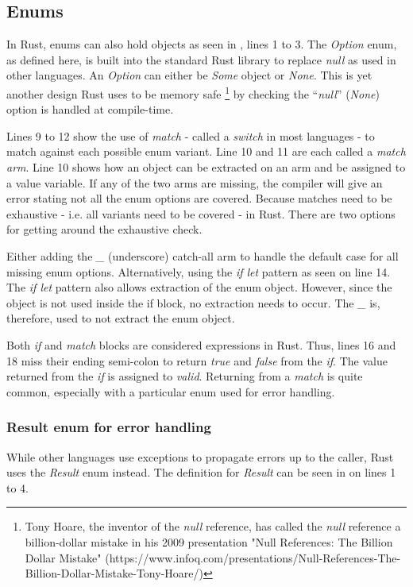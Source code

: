 \subsection{Enums}
In Rust, enums can also hold objects \cite{klabnik_2019_01} as seen in , lines 1 to 3.
The \textit{Option} enum, as defined here, is built into the standard Rust library \cite{klabnik_2019_01} to replace \textit{null} as used in other languages.
An \textit{Option} can either be \textit{Some} object or \textit{None}.
This is yet another design Rust uses to be memory safe \footnote{Tony Hoare, the inventor of the \textit{null} reference, has called the \textit{null} reference a billion-dollar mistake in his 2009 presentation "Null References: The Billion Dollar Mistake" (https://www.infoq.com/presentations/Null-References-The-Billion-Dollar-Mistake-Tony-Hoare/)} by checking the ``\textit{null}'' (\textit{None}) option is handled at compile-time.


Lines 9 to 12 show the use of \textit{match} - called a \textit{switch} in most languages - to match against each possible enum variant.
Line 10 and 11 are each called a \textit{match arm}.
Line 10 shows how an object can be extracted on an arm and be assigned to a value variable.
If any of the two arms are missing, the compiler will give an error stating not all the enum options are covered.
Because matches need to be exhaustive - i.e. all variants need to be covered - in Rust.
There are two options for getting around the exhaustive check. \cite{klabnik_2019_01}

Either adding the \textit{\_} (underscore) catch-all arm to handle the default case for all missing enum options.
Alternatively, using the \textit{if let} pattern as seen on line 14.
The \textit{if let} pattern also allows extraction of the enum object.
However, since the object is not used inside the if block, no extraction needs to occur.
The \textit{\_} is, therefore, used to not extract the enum object.

Both \textit{if} and \textit{match} blocks are considered expressions in Rust.
Thus, lines 16 and 18 miss their ending semi-colon to return \textit{true} and \textit{false} from the \textit{if}.
The value returned from the \textit{if} is assigned to \textit{valid}.
Returning from a \textit{match} is quite common, especially with a particular enum used for error handling.

\subsubsection{Result enum for error handling}
While other languages use exceptions to propagate errors up to the caller, Rust uses the \textit{Result} enum instead.
The definition for \textit{Result} can be seen in  on lines 1 to 4.

